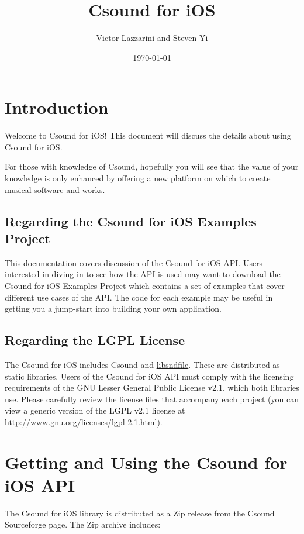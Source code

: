 \documentclass[11pt]{article}
\author{Victor Lazzarini and Steven Yi }
\date{\today}
\title{Csound for iOS}
\begin{document}
\maketitle

\section{Introduction}

Welcome to Csound for iOS! This document will discuss the details about using Csound for iOS.

For those with knowledge of Csound, hopefully you will see that the value of your knowledge is only enhanced by offering a new platform on which to create musical software and works.

\subsection{Regarding the Csound for iOS Examples Project}

This documentation covers discussion of the Csound for iOS API.  Users interested in diving in to see how the API is used may want to download the Csound for iOS Examples Project which contains a set of examples that cover different use cases of the API. The code for each example may be useful in getting you a jump-start into building your own application.

\subsection{Regarding the LGPL License}

The Csound for iOS includes Csound and \href{http://mega-nerd.com/libsndfile/}{libsndfile}. These are distributed as static libraries. Users of the Csound for iOS API must comply with the licensing requirements of the GNU Lesser General Public License v2.1, which both libraries use. Please carefully review the license files that accompany each project (you can view a generic version of the LGPL v2.1 license at \href{http://www.gnu.org/licenses/lgpl-2.1.html}{http://www.gnu.org/licenses/lgpl-2.1.html}).


\section{Getting and Using the Csound for iOS API}

The Csound for iOS library is distributed as a Zip release from the Csound Sourceforge page. The Zip archive includes:
\end{document}

